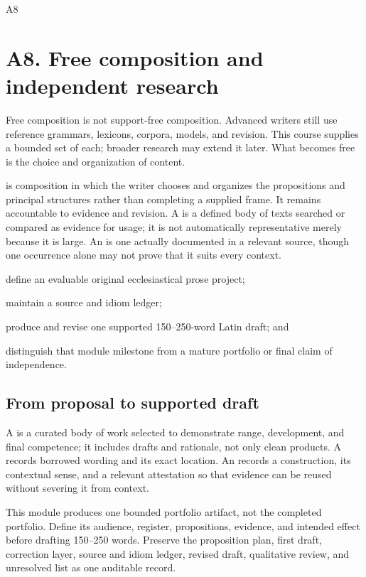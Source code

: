 \begin{courseunit}{A8}
\chapter{A8. Free composition and independent research}

Free composition is not support-free composition. Advanced writers still use
reference grammars, lexicons, corpora, models, and revision. This course
supplies a bounded set of each; broader research may extend it later. What
becomes free is the choice and organization of content.

 is composition in which the writer chooses and
organizes the propositions and principal structures rather than completing a
supplied frame. It remains accountable to evidence and revision. A
 is a defined body of texts searched or compared as evidence for
usage; it is not automatically representative merely because it is large. An
 is one actually documented in a relevant source,
though one occurrence alone may not prove that it suits every context.

\begin{learningobjectives}
  \item define an evaluable original ecclesiastical prose project;
  \item maintain a source and idiom ledger;
  \item produce and revise one supported 150--250-word Latin draft; and
  \item distinguish that module milestone from a mature portfolio or final
        claim of independence.
\end{learningobjectives}

\section{From proposal to supported draft}

A  is a curated body of work selected to demonstrate range,
development, and final competence; it includes drafts and rationale, not only
clean products. A  records borrowed wording and its exact
location. An  records a construction, its contextual sense,
and a relevant attestation so that evidence can be reused without severing it
from context.

This module produces one bounded portfolio artifact, not the completed
portfolio. Define its audience, register, propositions, evidence, and intended
effect before drafting 150--250 words. Preserve the proposition plan, first
draft, correction layer, source and idiom ledger, revised draft, qualitative
review, and unresolved list as one auditable record.


\end{courseunit}
